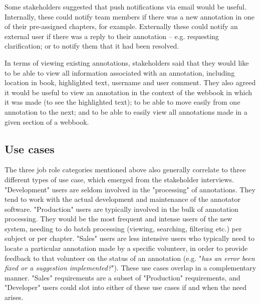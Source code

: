 Some stakeholders suggested that push notifications via email would be useful. Internally, these could notify team members if there was a new annotation in one of their pre-assigned chapters, for example. Externally these could notify an external user if there was a reply to their annotation – e.g. requesting clarification; or to notify them that it had been resolved.

In terms of viewing existing annotations, stakeholders said that they would like to be able to view all information associated with an annotation, including location in book, highlighted text, username and user comment. They also agreed it would be useful to view an annotation in the context of the webbook in which it was made (to see the highlighted text); to be able to move easily from one annotation to the next; and to be able to easily view all annotations made in a given section of a webbook.

\subsection{Use cases}
The three job role categories mentioned above also generally correlate to three different types of use case, which emerged from the stakeholder interviews. "Development" users are seldom involved in the "processing" of annotations. They tend to work with the actual development and maintenance of the annotator software. "Production" users are typically involved in the bulk of annotation processing. They would be the most frequent and intense users of the new system, needing to do batch processing (viewing, searching, filtering etc.) per subject or per chapter. "Sales" users are less intensive users who typically need to locate a particular annotation made  by a specific volunteer, in order to provide feedback to that volunteer on the status of an annotation (e.g. "\textit{has an error been fixed or a suggestion implemented?}"). These use cases overlap in a complementary manner. "Sales" requirements are a subset of "Production" requirements, and "Developer" users could slot into either of these use cases if and when the need arises. 

